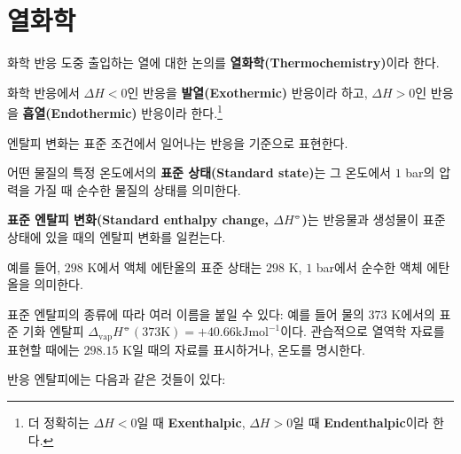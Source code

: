     \section{열화학} \label{thermalchem}
            \hspace{\parindent} 화학 반응 도중 출입하는 열에 대한 논의를 \textbf{열화학(Thermochemistry)}이라 한다.
            \begin{defn}[발열 반응과 흡열 반응]
            화학 반응에서 $\Delta H < 0$인 반응을 \textbf{발열(Exothermic)} 반응이라 하고, 
            $\Delta H > 0$인 반응을 \textbf{흡열(Endothermic)} 반응이라 한다.\footnote[7]{%
            더 정확히는 $\Delta H < 0$일 때 \textbf{Exenthalpic}, $\Delta H > 0$일 때 \textbf{Endenthalpic}이라 한다.}
            \end{defn}
            \par 엔탈피 변화는 표준 조건에서 일어나는 반응을 기준으로 표현한다.
            \begin{defn}[표준 상태]
            어떤 물질의 특정 온도에서의 \textbf{표준 상태(Standard state)}는 그 온도에서 $1$ bar의 압력을 가질 때 순수한 물질의 상태를 의미한다. 
            \end{defn}
            \begin{defn}[표준 엔탈피 변화]
            \textbf{표준 엔탈피 변화(Standard enthalpy change, $\Delta H^{\circlehbar}$)}는 반응물과 생성물이 표준 상태에 있을 때의 
            엔탈피 변화를 일컫는다.
            \end{defn}
            예를 들어, $298$ K에서 액체 에탄올의 표준 상태는 $298$ K, $1$ bar에서 순수한 액체 에탄올을 의미한다. 
            \par 표준 엔탈피의 종류에 따라 여러 이름을 붙일 수 있다: 예를 들어 물의 $373$ K에서의 표준 기화 엔탈피 
            $\Delta_{\mathrm{vap}}H^{\circlehbar}\left(373 \mathrm{K}\right) = +40.66 \mathrm{kJ mol}^{-1}$이다. 
            관습적으로 열역학 자료를 표현할 때에는 $298.15$ K일 때의 자료를 표시하거나, 온도를 명시한다.
            \par 반응 엔탈피에는 다음과 같은 것들이 있다:
